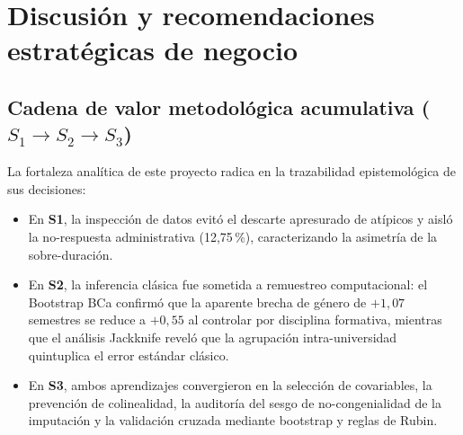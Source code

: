 \documentclass[11pt,a4paper]{article}
\begin{document}
\section{Discusión y recomendaciones estratégicas de negocio}

\subsection{Cadena de valor metodológica acumulativa ($S_1 \to S_2 \to S_3$)}
La fortaleza analítica de este proyecto radica en la trazabilidad epistemológica de sus decisiones:
\begin{itemize}[leftmargin=*]
\item En \textbf{S1}, la inspección de datos evitó el descarte apresurado de atípicos y aisló la no-respuesta administrativa (12,75\,\%), caracterizando la asimetría de la sobre-duración.
\item En \textbf{S2}, la inferencia clásica fue sometida a remuestreo computacional: el Bootstrap BCa confirmó que la aparente brecha de género de $+1,07$ semestres se reduce a $+0,55$ al controlar por disciplina formativa, mientras que el análisis Jackknife reveló que la agrupación intra-universidad quintuplica el error estándar clásico.
\item En \textbf{S3}, ambos aprendizajes convergieron en la selección de covariables, la prevención de colinealidad, la auditoría del sesgo de no-congenialidad de la imputación y la validación cruzada mediante bootstrap y reglas de Rubin.
\end{itemize}
\end{document}
